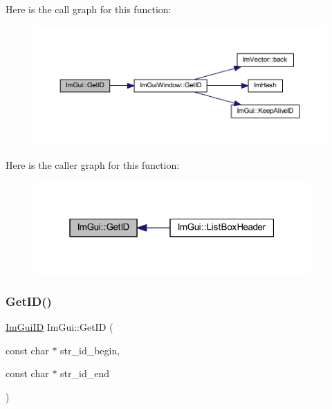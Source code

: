 Here is the call graph for this function\+:
\nopagebreak
\begin{figure}[H]
\begin{center}
\leavevmode
\includegraphics[width=350pt]{namespace_im_gui_a3329b04bd4235e90ad9deb00ffb38ae4_cgraph}
\end{center}
\end{figure}
Here is the caller graph for this function\+:
\nopagebreak
\begin{figure}[H]
\begin{center}
\leavevmode
\includegraphics[width=301pt]{namespace_im_gui_a3329b04bd4235e90ad9deb00ffb38ae4_icgraph}
\end{center}
\end{figure}
\mbox{\label{namespace_im_gui_a26064d74efebef3aa86e1a78b3e4c333}} 
\subsubsection{\texorpdfstring{Get\+I\+D()}{GetID()}\hspace{0.1cm}{\footnotesize\ttfamily [2/3]}}
{\footnotesize\ttfamily \mbox{\hyperlink{imgui_8h_a1785c9b6f4e16406764a85f32582236f}{Im\+Gui\+ID}} Im\+Gui\+::\+Get\+ID (\begin{DoxyParamCaption}\item[{const char $\ast$}]{str\+\_\+id\+\_\+begin,  }\item[{const char $\ast$}]{str\+\_\+id\+\_\+end }\end{DoxyParamCaption})}

